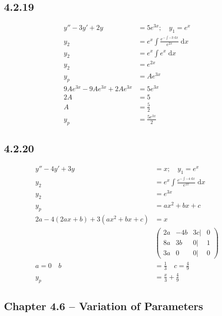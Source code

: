 \documentclass{article}
\begin{document}
\subsection{4.2.19}
\begin{align*}
    y''-3y'+2y &= 5e^{3x}; \quad y_1 = e^{x}\\
    y_2 &= e^{x}\int \frac{e^{-\int -3 \; \mathrm{d}x}}{e^{2x}} \; \mathrm{d}x\\
    y_2 &= e^{x}\int e^{x}\; \mathrm{d}x\\
    y_2 &= e^{2x}\\
    y_p &= Ae^{3x}\\
    9Ae^{3x}-9Ae^{3x}+2Ae^{3x} &= 5e^{3x}\\
    2A &= 5\\
    A &= \frac{5}{2}\\
    y_p &= \frac{5e^{3x}}{2}        
\end{align*}

\subsection{4.2.20}
\begin{align*}
    y''-4y'+3y &= x; \quad y_1 = e^{x}\\
    y_2 &= e^{x}\int \frac{e^{-\int -4 \; \mathrm{d}x}}{e^{2x}} \; \mathrm{d}x\\
    y_2  &= e^{3x}\\
    y_p  &= ax^2+bx+c\\
    2a-4(2ax+b)+3(ax^2+bx+c) &= x\\
    &\begin{pmatrix}2a&-4b&3c|&0\\ 8a & 3b & 0 | & 1 \\ 3a & 0 & 0 |& 0 \end{pmatrix}\\
    a=0 \quad b &= \frac{1}{3} \quad c = \frac{4}{9}\\
    y_p  &= \frac{x}{3}+\frac{4}{9}
\end{align*}


\subsection{Chapter 4.6 -- Variation of Parameters}
\end{document}
